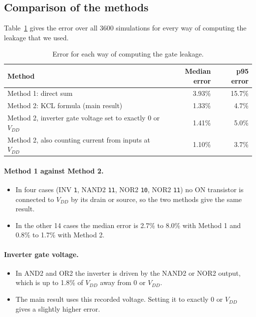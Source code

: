 \documentclass[11pt]{article}
\begin{document}
\subsection{Comparison of the methods}

Table~\ref{tab:variants} gives the error over all 3600 simulations for every
way of computing the leakage that we used.

\begin{table}[H]
\centering
\begin{tabular}{lrr}
\toprule
Method & Median error & p95 error \\
\midrule
Method 1: direct sum & 3.93\% & 15.7\% \\
Method 2: KCL formula (main result) & 1.33\% & 4.7\% \\
Method 2, inverter gate voltage set to exactly 0 or $V_{DD}$ & 1.41\% & 5.0\% \\
Method 2, also counting current from inputs at $V_{DD}$ & 1.10\% & 3.7\% \\
\bottomrule
\end{tabular}
\caption{Error for each way of computing the gate leakage.}
\label{tab:variants}
\end{table}

\paragraph{Method 1 against Method 2.}
\begin{itemize}
    \item In four cases (INV \texttt{1}, NAND2 \texttt{11}, NOR2 \texttt{10},
          NOR2 \texttt{11}) no ON transistor is connected to $V_{DD}$ by its
          drain or source, so the two methods give the same result.
    \item In the other 14 cases the median error is 2.7\% to 8.0\% with
          Method 1 and 0.8\% to 1.7\% with Method 2.
\end{itemize}

\paragraph{Inverter gate voltage.}
\begin{itemize}
    \item In AND2 and OR2 the inverter is driven by the NAND2 or NOR2
          output, which is up to 1.8\% of $V_{DD}$ away from 0 or $V_{DD}$.
    \item The main result uses this recorded voltage. Setting it to exactly
          0 or $V_{DD}$ gives a slightly higher error.
\end{itemize}
\end{document}
